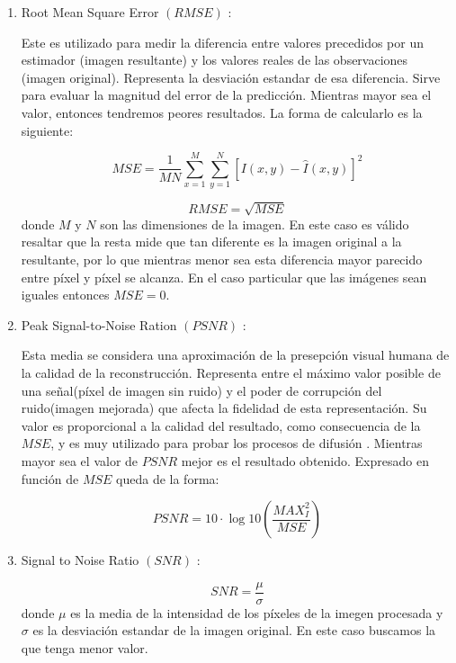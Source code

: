 \documentclass[a4paper,10pt,twocolumn]{article}
\begin{document}
\begin{enumerate}
\item Root Mean Square Error $(RMSE)$ \cite{gupta}:

Este es utilizado para medir la diferencia entre valores precedidos por un estimador (imagen resultante) y los valores reales de las observaciones (imagen original). Representa la desviaci\'on estandar de esa diferencia. Sirve para evaluar la magnitud del error de la predicci\'on. Mientras mayor sea el valor, entonces tendremos peores resultados. La forma de calcularlo es la siguiente:

\begin{equation}
	MSE = \frac{1}{MN} \sum_{x=1}^M \sum_{y=1}^N [I(x,y) - \hat{I} (x,y)]^2
\end{equation}

\begin{equation}
	RMSE = \sqrt{MSE}
\end{equation}
donde $M$ y $N$ son las dimensiones de la imagen. En este caso es v\'alido resaltar que la resta mide que tan diferente es la imagen original a la resultante, por lo que mientras menor sea esta diferencia mayor parecido entre p\'ixel y p\'ixel se alcanza. En el caso particular que las im\'agenes sean iguales entonces $MSE = 0$.

\item Peak Signal-to-Noise Ration $(PSNR)$ \cite{perona_malik}:

Esta media se considera una aproximaci\'on de la presepci\'on visual humana de la calidad de la reconstrucci\'on. Representa entre el m\'aximo valor posible de una se\~nal(p\'ixel de imagen sin ruido) y el poder de corrupci\'on del ruido(imagen mejorada) que afecta la fidelidad de esta representaci\'on. Su valor es proporcional a la calidad del resultado, como consecuencia de la $MSE$, y es muy utilizado para probar los procesos de difusi\'on \cite{krishnan}. Mientras mayor sea el valor de $PSNR$ mejor es el resultado obtenido. Expresado en funci\'on de $MSE$ queda de la forma:

\begin{equation}
	PSNR = 10 \cdot \log{10}{\left (\frac{MAX_I^2}{MSE}\right )}
\end{equation}

\item Signal to Noise Ratio $(SNR)$ \cite{achanta}:

\begin{equation}
	SNR = \frac{\mu}{\sigma}
\end{equation}
donde $\mu$ es la media de la intensidad de los p\'ixeles de la imegen procesada y $\sigma$  es la desviaci\'on estandar de la imagen original. En este caso buscamos la que tenga menor valor.
\end{enumerate}
\end{document}
